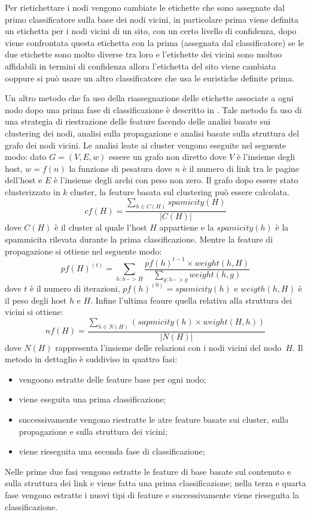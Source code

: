 Per rietichettare i nodi vengono cambiate le etichette che sono assegnate dal primo classificatore  sulla base dei nodi vicini, in particolare
prima viene definita un etichetta per i nodi vicini di un sito, con un certo livello di confidenza, dopo viene confrontata questa etichetta con la prima (assegnata dal classificatore) se le due etichette sono molto diverse tra loro e l'etichette dei vicini sono moltoo affidabili in termini di confidenza 
allora l’etichetta del sito viene cambiata ooppure si può usare un altro classificatore che usa le euristiche definite prima.

Un altro metodo che fa uso della riassegnazione delle etichette associate a ogni nodo dopo una prima fase di classificazione è descritto in \cite{Geng:2008:IWS:1367497.1367685}. Tale metodo fa uso di una strategia di riestrazione delle feature facendo delle analisi basate sui clustering dei nodi, analisi sulla propagazione e analisi basate sulla struttura del grafo dei nodi vicini. 
Le analisi leate ai cluster vengono eseguite nel seguente modo: dato \(G=(V,E,w)\) essere un grafo non diretto dove \(V\) è l'insieme degli host, \(w=f(n)\) la funzione di pesatura dove \(n\) è il numero di link tra le pagine dell'host e \(E\) è l'insieme degli archi con peso non zero. Il grafo dopo essere stato clusterizzato in \(k\) cluster, la feature basata sul clustering può essere calcolata.
\begin{equation}
 cf(H)=\frac{\sum_{h\in C(H)}spamicity(H)}{|C(H)|}
\end{equation}
dove \(C(H)\) è il cluster al quale l'host \(H\) appartiene e la \(spamicity(h)\) è la spammicita rilevata durante la prima classificazione. Mentre la feature di propagazione si ottiene nel seguente modo:
\begin{equation}
 pf(H)^{(t)}=\sum_{h:h->H}\frac{pf(h)^{t-1}\times weight(h,H)}{\sum_{g:h->g}weight(h,g)}
\end{equation}
dove \(t\) è il numero di iterazioni, \(pf(h)^{(0)}=spamicity(h)\) e \(weigth(h,H)\) è il peso degli host \(h\) e \(H\). Infine l'ultima feaure quella relativa alla struttura dei vicini si ottiene:
\begin{equation}
 nf(H)=\frac{\sum_{h\in N(H)}(sapmicity(h)\times weight(H,h))}{|N(H)|}
\end{equation}
dove \(N(H)\) rappresenta l'insieme delle relazioni con i nodi vicini del nodo\ \(H\). Il metodo in dettaglio è suddiviso in quattro fasi:
\begin{itemize}
 \item vengoono estratte delle feature base per ogni nodo;
 \item viene eseguita una prima classificazione;
 \item successivamente vengono riestratte le atre feature basate sui cluster, sulla propagazione e sulla struttura dei vicini;
 \item viene rieseguita una seconda fase di classificazione;
\end{itemize}
Nelle prime due fasi vengono estratte le feature di base basate sul contenuto e sulla struttura dei link e viene fatta una prima classificazione; nella terza e quarta fase vengono estratte i nuovi tipi di feature e successivamente viene rieseguita la classificazione.

